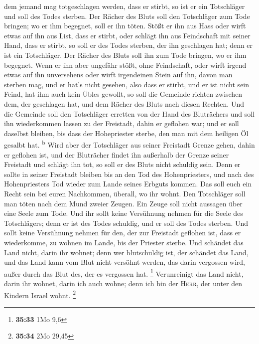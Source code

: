 dem jemand mag totgeschlagen werden, dass er stirbt, so ist er ein
Totschläger und soll des Todes sterben.  Der Rächer des
Bluts soll den Totschläger zum Tode bringen; wo er ihm begegnet, soll er
ihn töten.  Stößt er ihn aus Hass oder wirft etwas auf
ihn aus List, dass er stirbt,  oder schlägt ihn aus
Feindschaft mit seiner Hand, dass er stirbt, so soll er des Todes
sterben, der ihn geschlagen hat; denn er ist ein Totschläger. Der Rächer
des Bluts soll ihn zum Tode bringen, wo er ihm begegnet. 
Wenn er ihn aber ungefähr stößt, ohne Feindschaft, oder wirft irgend
etwas auf ihn unversehens  oder wirft irgendeinen Stein
auf ihn, davon man sterben mag, und er hat's nicht gesehen, also dass er
stirbt, und er ist nicht sein Feind, hat ihm auch kein Übles gewollt,
 so soll die Gemeinde richten zwischen dem, der
geschlagen hat, und dem Rächer des Bluts nach diesen Rechten.
 Und die Gemeinde soll den Totschläger erretten von der
Hand des Bluträchers und soll ihn wiederkommen lassen zu der Freistadt,
dahin er geflohen war; und er soll daselbst bleiben, bis dass der
Hohepriester sterbe, den man mit dem heiligen Öl gesalbt hat.
\textsuperscript{b}  Wird aber der Totschläger aus seiner
Freistadt Grenze gehen, dahin er geflohen ist,  und der
Bluträcher findet ihn außerhalb der Grenze seiner Freistadt und schlägt
ihn tot, so soll er des Bluts nicht schuldig sein.  Denn
er sollte in seiner Freistadt bleiben bis an den Tod des Hohenpriesters,
und nach des Hohenpriesters Tod wieder zum Lande seines Erbguts kommen.
 Das soll euch ein Recht sein bei euren Nachkommen,
überall, wo ihr wohnt.  Den Totschläger soll man töten
nach dem Mund zweier Zeugen. Ein Zeuge soll nicht aussagen über eine
Seele zum Tode.  Und ihr sollt keine Versühnung nehmen
für die Seele des Totschlägers; denn er ist des Todes schuldig, und er
soll des Todes sterben.  Und sollt keine Versühnung
nehmen für den, der zur Freistadt geflohen ist, dass er wiederkomme, zu
wohnen im Lande, bis der Priester sterbe.  Und schändet
das Land nicht, darin ihr wohnet; denn wer blutschuldig ist, der
schändet das Land, und das Land kann vom Blut nicht versöhnt werden, das
darin vergossen wird, außer durch das Blut des, der es vergossen hat.
\footnote{\textbf{35:33} 1Mo 9,6}  Verunreinigt das Land
nicht, darin ihr wohnet, darin ich auch wohne; denn ich bin der
\textsc{Herr}, der unter den Kindern Israel wohnt. \footnote{\textbf{35:34}
  2Mo 29,45}

